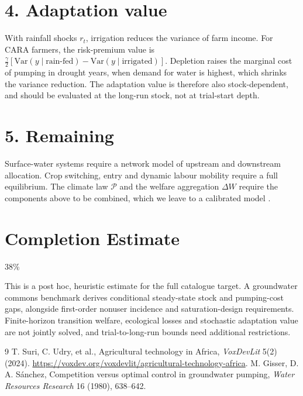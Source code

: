 \documentclass[11pt]{article}
\theoremstyle{definition}
\begin{document}
\section*{4. Adaptation value}
With rainfall shocks $r_t$, irrigation reduces the variance of farm income. For CARA farmers, the risk-premium value is
$\tfrac\gamma2[\mathrm{Var}(y\mid\text{rain-fed})-\mathrm{Var}(y\mid\text{irrigated})]$. Depletion raises the marginal cost
of pumping in drought years, when demand for water is highest, which shrinks the variance reduction. The adaptation value is
therefore also stock-dependent, and should be evaluated at the long-run stock, not at trial-start depth.

\section*{5. Remaining}
Surface-water systems require a network model of upstream and downstream allocation. Crop switching, entry and dynamic labour
mobility require a full equilibrium. The climate law $\mathcal P$ and the welfare aggregation $\Delta W$ require the
components above to be combined, which we leave to a calibrated model \cite{suri}.

\section{Completion Estimate}
38\%

This is a post hoc, heuristic estimate for the full catalogue target.
A groundwater commons benchmark derives conditional steady-state stock and pumping-cost gaps, alongside first-order nonuser incidence and saturation-design requirements. Finite-horizon transition welfare, ecological losses and stochastic adaptation value are not jointly solved, and trial-to-long-run bounds need additional restrictions.

\begin{thebibliography}{9}
 T. Suri, C. Udry, et al., Agricultural technology in Africa, \emph{VoxDevLit} 5(2) (2024). \url{https://voxdev.org/voxdevlit/agricultural-technology-africa}.
 M. Gisser, D. A. S\'anchez, Competition versus optimal control in groundwater pumping, \emph{Water Resources Research} 16 (1980), 638--642.
\end{thebibliography}
\end{document}
